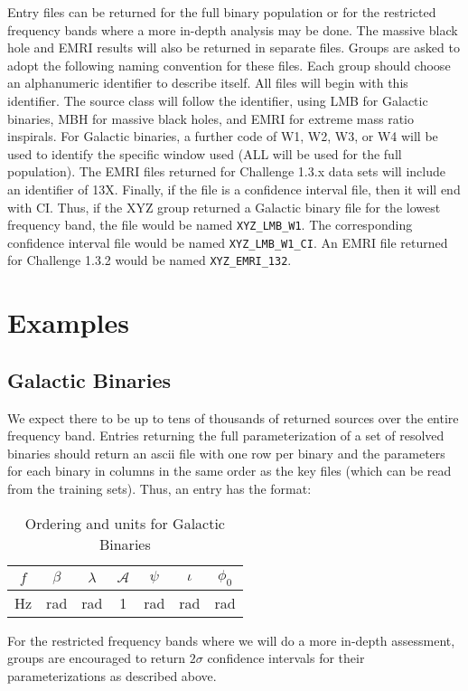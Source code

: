 \documentclass[11pt]{article}
\begin{document}
Entry files can be returned for the full binary population or for the restricted frequency bands where a more in-depth analysis may be done. The massive black hole and EMRI results will also be returned in separate files. Groups are asked to adopt the following naming convention for these files. Each group should choose an alphanumeric identifier to describe itself. All files will begin with this identifier. The source class will follow the identifier, using LMB for Galactic binaries, MBH for massive black holes, and EMRI for extreme mass ratio inspirals. For Galactic binaries, a further code of W1, W2, W3, or W4 will be used to identify the specific window used (ALL will be used for the full population). The EMRI files returned for Challenge 1.3.x data sets will include an identifier of 13X. Finally, if the file is a confidence interval file, then it will end with CI. Thus, if the XYZ group returned a Galactic binary file for the lowest frequency band, the file would be named {\tt XYZ\_LMB\_W1}. The corresponding confidence interval file would be named {\tt XYZ\_LMB\_W1\_CI}. An EMRI file returned for Challenge 1.3.2 would be named {\tt XYZ\_EMRI\_132}.


\section{Examples}
\subsection{Galactic Binaries}
We expect there to be up to tens of thousands of returned sources over the entire frequency band. Entries returning the full parameterization of a set of resolved binaries should return an ascii file with one row per binary and the parameters for each binary in columns in the same order as the key files (which can be read from the training sets). Thus, an entry has the format:
\begin{table}[h]
   \centering
   \caption{Ordering and units for Galactic Binaries}
   \begin{tabular}{ccccccc}
      \hline
      $f$ & $\beta$ & $\lambda$ & $\mathcal{A}$ & $\psi$ & $\iota$ & $\phi_0$ \\
      \hline
      Hz & rad & rad & 1 & rad & rad & rad \\
      \hline
   \end{tabular}
   \label{galacticbinaries}
\end{table}

For the restricted frequency bands where we will do a more in-depth assessment, groups are encouraged to return $2\sigma$ confidence intervals for their parameterizations as described above.
\end{document}
